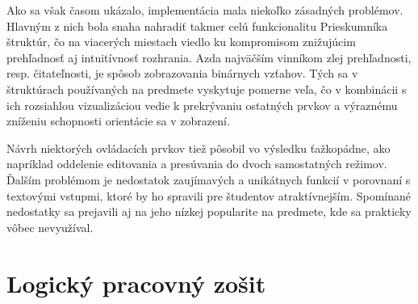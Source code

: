 Ako sa však časom ukázalo, implementácia mala niekoľko zásadných problémov. Hlavným z nich bola snaha nahradiť takmer celú funkcionalitu Prieskumníka štruktúr, čo na viacerých miestach viedlo ku kompromisom znižujúcim prehľadnosť aj intuitívnosť rozhrania. Azda najväčším vinníkom zlej prehľadnosti, resp. čitateľnosti, je spôsob zobrazovania binárnych vzťahov. Tých sa v štruktúrach používaných na predmete vyskytuje pomerne veľa, čo v kombinácii s ich rozsiahlou vizualizáciou vedie k prekrývaniu ostatných prvkov a výraznému zníženiu schopnosti orientácie sa v zobrazení.

Návrh niektorých ovládacích prvkov tiež pôsobil vo výsledku ťažkopádne, ako napríklad oddelenie editovania a presúvania do dvoch samostatných režimov. Ďalším problémom je nedostatok zaujímavých a unikátnych funkcií v porovnaní s textovými vstupmi, ktoré by ho spravili pre študentov atraktívnejším. Spomínané nedostatky sa prejavili aj na jeho nízkej popularite na predmete, kde sa prakticky vôbec nevyužíval.


\section{Logický pracovný zošit}
\label{sec:workbook}



